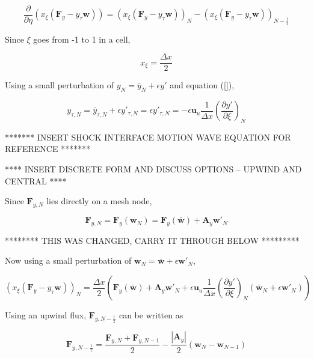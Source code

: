\documentclass[10pt]{article}
\begin{document}
	$$ \frac{\partial}{\partial \eta} (x_\xi (\mathbf{F}_y - y_\tau \mathbf{w})) =  (x_\xi (\mathbf{F}_y - y_\tau \mathbf{w}))_{N} - (x_\xi (\mathbf{F}_y - y_\tau \mathbf{w}))_{N-\frac{1}{2}} $$
	
	Since $\xi$ goes from -1 to 1 in a cell,
	
	$$ x_{\xi}= \frac{\Delta x}{2} $$
	
	Using a small perturbation of $y_N = \bar{y}_N + \epsilon y'$ and equation (\ref{}), 
	
	$$ y_{\tau,N} = \bar{y}_{\tau,N} + \epsilon y'_{\tau,N} = \epsilon y'_{\tau,N} = - \epsilon \mathbf{u}_u \frac{1}{\Delta x} \left( \frac{\partial y'}{\partial \xi} \right)_N $$
	
	******* INSERT SHOCK INTERFACE MOTION WAVE EQUATION FOR REFERENCE *******
	
	**** INSERT DISCRETE FORM AND DISCUSS OPTIONS -- UPWIND AND CENTRAL ****
	
	Since $\mathbf{F}_{y,N}$ lies directly on a mesh node,
	
	$$ \mathbf{F}_{y,N} = \mathbf{F}_{y}(\mathbf{w}_N) = \mathbf{F}_{y}(\bar{\mathbf{w}}) + \mathbf{A}_y \mathbf{w}'_N$$
	
	******** THIS WAS CHANGED, CARRY IT THROUGH BELOW *********
	
	Now using a small perturbation of $\mathbf{w}_N = \bar{\mathbf{w}} + \epsilon \mathbf{w}'_N$,
	
	
	
	\begin{equation} \label{shock_term2_pt1}
		(x_\xi (\mathbf{F}_y - y_\tau \mathbf{w}))_{N} = \frac{\Delta x}{2} \left( \mathbf{F}_{y}(\bar{\mathbf{w}}) + \mathbf{A}_y \mathbf{w}'_N + \epsilon \mathbf{u}_u \frac{1}{\Delta x} \left( \frac{\partial y'}{\partial \xi} \right)_N (\bar{\mathbf{w}}_N + \epsilon \mathbf{w}'_N) \right)
	\end{equation}
	
	
	Using an upwind flux, $\mathbf{F}_{y,N-\frac{1}{2}}$ can be written as
	
	$$ \mathbf{F}_{y,N-\frac{1}{2}} = \frac{\mathbf{F}_{y,N} + \mathbf{F}_{y,N-1}}{2} - \frac{|\mathbf{A}_y|}{2}(\mathbf{w}_{N} - \mathbf{w}_{N-1})$$
	
\end{document}
